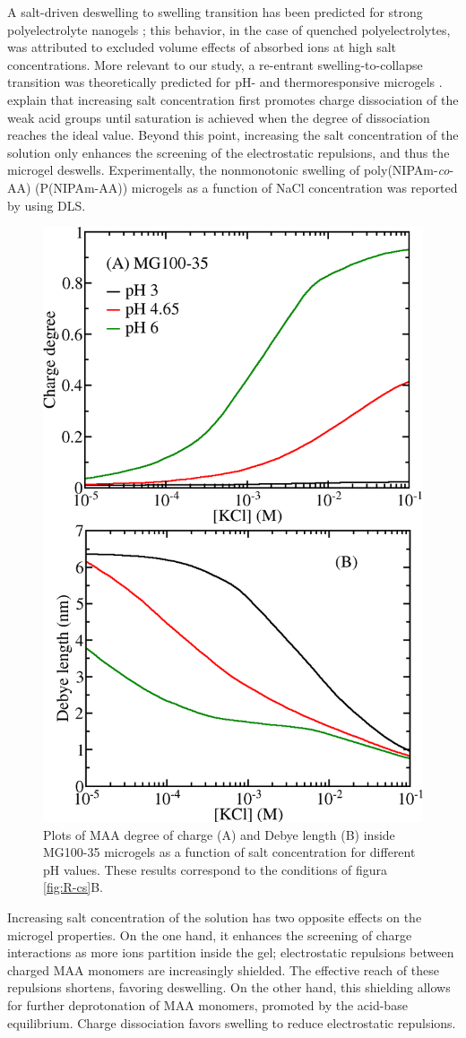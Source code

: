 A salt-driven deswelling to swelling transition has been predicted for strong polyelectrolyte nanogels ;
this behavior, in the case of quenched polyelectrolytes, was attributed to excluded volume effects of absorbed ions at high salt concentrations.
More relevant to our study, a re-entrant swelling-to-collapse transition was theoretically predicted for pH- and thermoresponsive microgels .
 explain that increasing salt concentration first promotes charge dissociation of the weak acid groups until saturation is achieved when the degree of dissociation reaches the ideal value. 
Beyond this point, increasing the salt concentration of the solution only enhances the screening of the electrostatic repulsions, and thus the microgel deswells.
Experimentally, the nonmonotonic swelling of poly(NIPAm-\emph{co}-AA) (P(NIPAm-AA)) microgels as a function of NaCl concentration was reported by  using DLS.

\begin{figure}[!tb]
	\centering
	\includegraphics[width=0.5\linewidth]{Figures/graph-gel/f-cs.png}
	\caption{Plots of MAA degree of charge (A) and Debye length (B) inside MG100-35 microgels as a function of salt concentration for different pH values.
		These results correspond to the conditions of figura \ref{fig:R-cs}B.}
	\label{fig:f-cs}
\end{figure}




Increasing salt concentration of the solution has two opposite effects on the microgel properties.
On the one hand, it enhances the screening of charge interactions as more ions partition inside the gel; electrostatic repulsions between charged MAA monomers are increasingly shielded.
The effective reach of these repulsions shortens, favoring deswelling.
On the other hand, this shielding allows for further deprotonation of MAA monomers, promoted by the acid-base equilibrium.
Charge dissociation favors swelling to reduce electrostatic repulsions.


